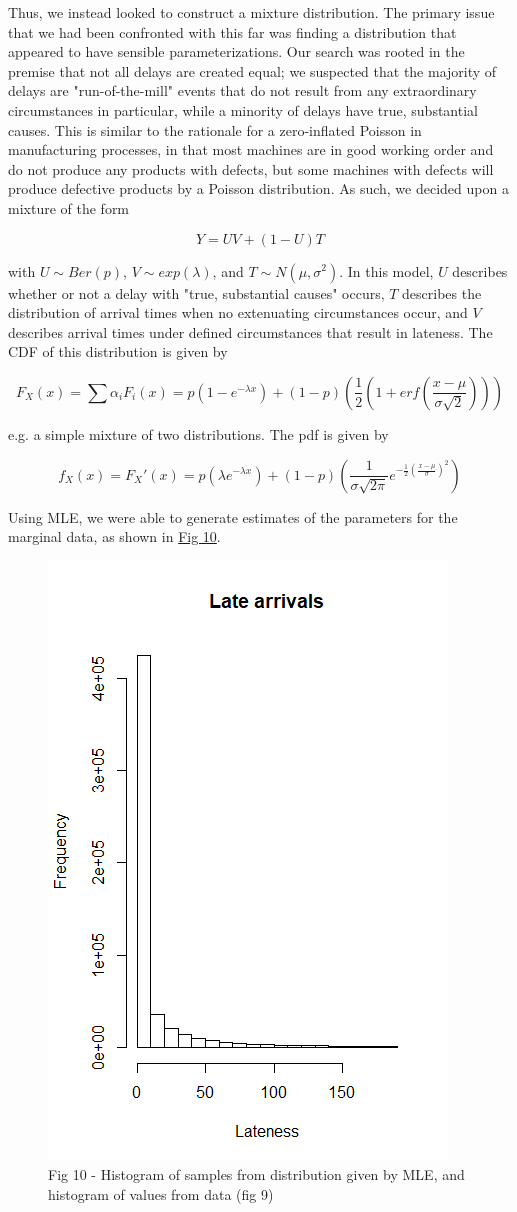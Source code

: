 \documentclass[12pt, a4paper]{book}
\newcommand\tab[1][1cm]{\hspace*{#1}}
\begin{document}
	\tab Thus, we instead looked to construct a mixture distribution. The primary issue that we had been confronted with this far was finding a distribution that appeared to have sensible parameterizations.  Our search was rooted in the premise that not all delays are created equal;  we suspected that the majority of delays are "run-of-the-mill" events that do not result from any extraordinary circumstances in particular, while a minority of delays have true, substantial causes. This is similar to the rationale for a zero-inflated Poisson in manufacturing processes, in that most machines are in good working order and do not produce any products with defects, but some machines with defects will produce defective products by a Poisson distribution. As such, we decided upon a mixture of the form \begin{center}$$Y = UV + (1-U)T$$\end{center} with $U\sim Ber(p)$, $V\sim exp(\lambda)$, and $T\sim  N(\mu,\sigma^2)$. In this model, $U$ describes whether or not a delay with "true, substantial causes" occurs, $T$ describes the distribution of arrival times when no extenuating circumstances occur, and $V$ describes arrival times under defined circumstances that result in lateness. The CDF of this distribution is given by 
	\begin{center}$$F_X(x) = \sum \alpha_i F_i(x) = p(1-e^{-\lambda x}) + (1-p)\left(\frac{1}{2}(1+ erf(\frac{x-\mu}{\sigma\sqrt{2}}))\right)$$\end{center}
	e.g. a simple mixture of two distributions. The pdf is given by \begin{center}
	$$f_X(x) = F_X'(x) = p(\lambda e^{-\lambda x} ) + (1-p)\left(\frac{1}{\sigma \sqrt{2\pi}} e^{-\frac{1}{2}(\frac{x-\mu}{\sigma})^2}\right)$$
	\end{center}
	Using MLE, we were able to generate estimates of the parameters for the marginal data, as shown in \underline{Fig 10}.\\
			\begin{figure}
			\centering
	 		\includegraphics[width = .45 \textwidth]{../figures/LateArrivalsHistogram}
	 		\caption{Fig 10 - Histogram of samples from distribution given by MLE, and histogram of values from data (fig 9)}
	 		\end{figure}
\end{document}
